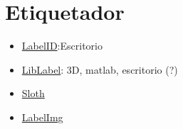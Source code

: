 
\section{Etiquetador}


\begin{itemize}
	\item \href{https://sweppner.github.io/labeld/}{LabelID}:Escritorio
	\item \href{http://www.cvlibs.net/software/liblabel/}{LibLabel}: 3D, matlab, escritorio (?)
	\item \href{https://cvhci.anthropomatik.kit.edu/~baeuml/projects/a-universal-labeling-tool-for-computer-vision-sloth/}{Sloth}
	\item \href{https://github.com/tzutalin/labelImg}{LabelImg}
\end{itemize}